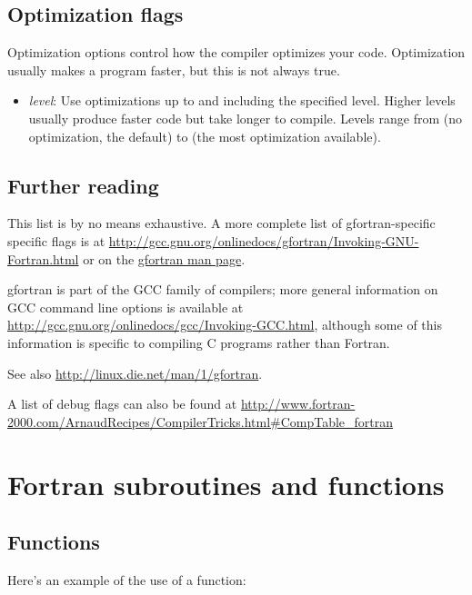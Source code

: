 \documentclass[letterpaper,10pt,english]{sphinxmanual}
\begin{document}
\subsection{Optimization flags}
\label{gfortran_flags:optimization-flags}
Optimization options control how the compiler optimizes your code.
Optimization usually makes a program faster, but this is not always
true.
\begin{itemize}
\item {} 
 \emph{level}: Use optimizations up to and including the specified
level.  Higher levels usually produce faster code but take longer
to compile.  Levels range from  (no optimization, the
default) to  (the most optimization available).

\end{itemize}


\subsection{Further reading}
\label{gfortran_flags:further-reading}
This list is by no means exhaustive.  A more complete list of
gfortran-specific specific flags is at
\url{http://gcc.gnu.org/onlinedocs/gfortran/Invoking-GNU-Fortran.html}
or on the \href{http://linux.die.net/man/1/gfortran}{gfortran man page}.

gfortran is part of the GCC family of compilers; more general
information on GCC command line options is available at
\url{http://gcc.gnu.org/onlinedocs/gcc/Invoking-GCC.html}, although
some of this information is specific to compiling C programs rather
than Fortran.

See also \url{http://linux.die.net/man/1/gfortran}.

A list of debug flags can also be found at
\url{http://www.fortran-2000.com/ArnaudRecipes/CompilerTricks.html\#CompTable\_fortran}


\section{Fortran subroutines and functions}
\label{fortran_sub:fortran-sub}\label{fortran_sub::doc}\label{fortran_sub:fortran-subroutines-and-functions}

\subsection{Functions}
\label{fortran_sub:functions}
Here's an example of the use of a function:
\end{document}
